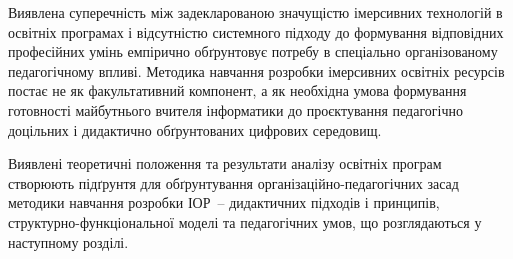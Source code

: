 Виявлена суперечність між задекларованою значущістю імерсивних технологій в освітніх програмах і відсутністю системного підходу до формування відповідних професійних умінь емпірично обґрунтовує потребу в спеціально організованому педагогічному впливі. Методика навчання розробки імерсивних освітніх ресурсів постає не як факультативний компонент, а як необхідна умова формування готовності майбутнього вчителя інформатики до проєктування педагогічно доцільних і дидактично обґрунтованих цифрових середовищ.

Виявлені теоретичні положення та результати аналізу освітніх програм створюють підґрунтя для обґрунтування організаційно-педагогічних засад методики навчання розробки ІОР~-- дидактичних підходів і принципів, структурно-функціональної моделі та педагогічних умов, що розглядаються у наступному розділі.

